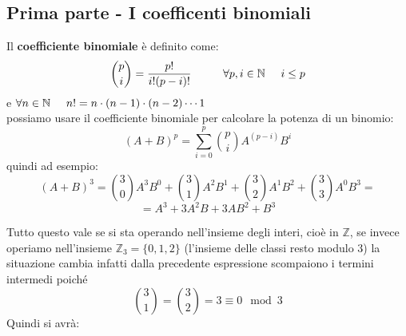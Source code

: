 \documentclass[14pt,a4paper]{article}
\begin{document}
	\subsection{Prima parte - I coefficenti binomiali}
	Il \textbf{coefficiente binomiale} è definito come:\begin{equation*} \binom{p}{i}=\frac{p!}{i!(p-i)!} \hspace{1cm} \forall p,i \in \mathbb{N}  \hspace{0.5cm}  i \leq p \end{equation*}
	e $ \forall n \in \mathbb{N} \hspace{0.5cm} n!=n\cdot (n-1)\cdot (n-2) \cdots 1$\\
	possiamo usare il coefficiente binomiale per calcolare la potenza \hspace{0.5cm}di un binomio:
	\begin{equation*} (A+B)^{p}=\sum_{i=0}^{p} \binom{p}{i}A^{(p-i)}B^i \end{equation*}
	quindi ad esempio:
	\begin{equation*}
		(A+B)^3=\binom{3}{0}A^3B^0+\binom{3}{1}A^2B^1+\binom{3}{2}A^1B^2+\binom{3}{3}A^0B^3= 
	\end{equation*}
	\begin{equation*}
		=A^3+3A^2B+3AB^2+B^3  
	\end{equation*}
	
	Tutto questo vale se si sta operando nell'insieme degli interi, cioè in $ \mathbb{Z }$,
	se invece operiamo nell'insieme $ \mathbb{Z}_3=\{0,1,2\} $ (l'insieme delle classi resto modulo 3) la situazione cambia infatti dalla precedente espressione scompaiono i termini intermedi poiché\\ \[ \binom{3}{1}=\binom{3}{2}=3\equiv0 \mod 3 \]
	Quindi si avrà:
	
\end{document}
